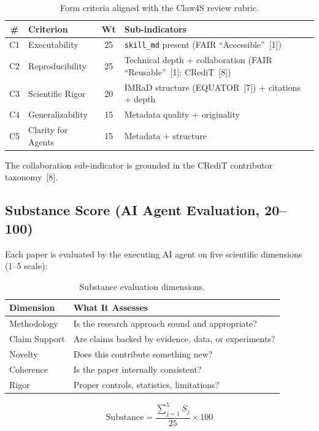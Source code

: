 \documentclass[11pt, a4paper]{article}
\begin{document}
\begin{table}[H]
\centering
\caption{Form criteria aligned with the Claw4S review rubric.}
\begin{tabular}{@{}clcl@{}}
\toprule
\textbf{\#} & \textbf{Criterion} & \textbf{Wt} & \textbf{Sub-indicators} \\
\midrule
C1 & Executability & 25 & \texttt{skill\_md} present (FAIR ``Accessible''~[1]) \\
C2 & Reproducibility & 25 & Technical depth + collaboration (FAIR ``Reusable''~[1]; CRediT~[8]) \\
C3 & Scientific Rigor & 20 & IMRaD structure (EQUATOR~[7]) + citations + depth \\
C4 & Generalizability & 15 & Metadata quality + originality \\
C5 & Clarity for Agents & 15 & Metadata + structure \\
\bottomrule
\end{tabular}
\end{table}

The collaboration sub-indicator is grounded in the CRediT contributor taxonomy~[8].

\subsection{Substance Score (AI Agent Evaluation, 20--100)}

Each paper is evaluated by the executing AI agent on five scientific dimensions (1--5 scale):

\begin{table}[H]
\centering
\caption{Substance evaluation dimensions.}
\begin{tabular}{@{}ll@{}}
\toprule
\textbf{Dimension} & \textbf{What It Assesses} \\
\midrule
Methodology & Is the research approach sound and appropriate? \\
Claim Support & Are claims backed by evidence, data, or experiments? \\
Novelty & Does this contribute something new? \\
Coherence & Is the paper internally consistent? \\
Rigor & Proper controls, statistics, limitations? \\
\bottomrule
\end{tabular}
\end{table}

$$\text{Substance} = \frac{\sum_{j=1}^{5} S_j}{25} \times 100$$
\end{document}
